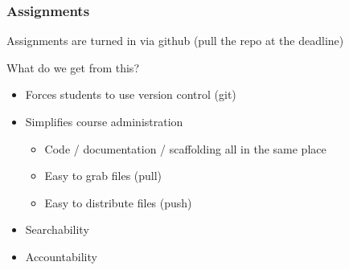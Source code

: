 \documentclass[12pt]{beamer}
\begin{document}
\begin{frame}
\frametitle{Assignments}

Assignments are turned in via github (pull the repo at the deadline)

\vspace{3mm}

What do we get from this?
\begin{itemize}
\item Forces students to use version control (git)
\item Simplifies course administration
\begin{itemize}
\item Code / documentation / scaffolding all in the same place
\item Easy to grab files (pull)
\item Easy to distribute files (push)
\end{itemize}
\item Searchability
\item Accountability
\end{itemize}

\end{frame}
\end{document}
